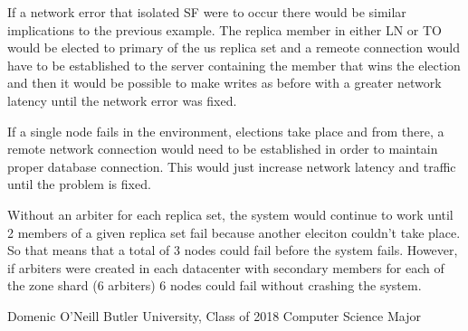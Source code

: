 If a network error that isolated SF were to occur there would be similar implications to the previous example. The replica member in either LN or TO would be elected to primary of the us replica set and a remeote connection would have to be established to the server containing the member that wins the election and then it would be possible to make writes as before with a greater network latency until the network error was fixed.

If a single node fails in the environment, elections take place and from there, a remote network connection would need to be established in order to maintain proper database connection. This would just increase network latency and traffic until the problem is fixed.

Without an arbiter for each replica set, the system would continue to work until 2 members of a given replica set fail because another eleciton couldn't take place. So that means that a total of 3 nodes could fail before the system fails. However, if arbiters were created in each datacenter with secondary members for each of the zone shard 
(6 arbiters) 6 nodes could fail without crashing the system.

 

Domenic O'Neill
Butler University, Class of 2018
Computer Science Major